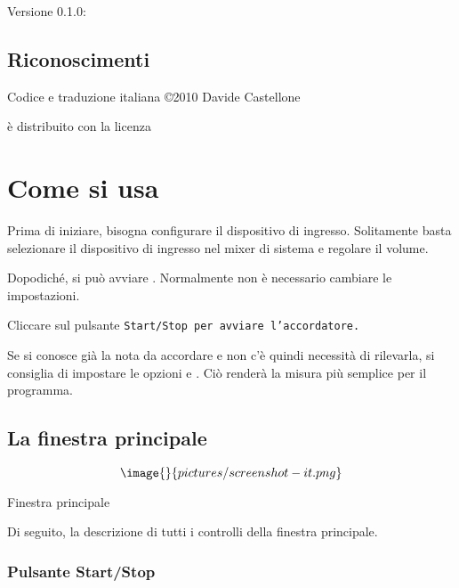 Versione 0.1.0:


\section{Riconoscimenti}\label{credits}

Codice e traduzione italiana \copyright 2010 Davide Castellone

 è distribuito con la licenza


\chapter{Come si usa}\label{using}

Prima di iniziare, bisogna configurare il dispositivo di
ingresso. Solitamente basta selezionare il dispositivo
di ingresso nel mixer di sistema e regolare il volume.

Dopodiché, si può avviare . Normalmente
non è necessario cambiare le impostazioni.

Cliccare sul pulsante \tt{Start/Stop} per avviare l'accordatore.

Se si conosce già la nota da accordare e non c'è quindi
necessità di rilevarla, si consiglia di impostare le
opzioni  e .
Ciò renderà la misura più semplice per il programma.

\section{La finestra principale}\label{mainwindow}

$$\image{}{pictures/screenshot-it.png}$$
\caption{Finestra principale}

Di seguito, la descrizione di tutti i controlli della finestra principale.

\subsection{Pulsante Start/Stop}\label{startstop}

